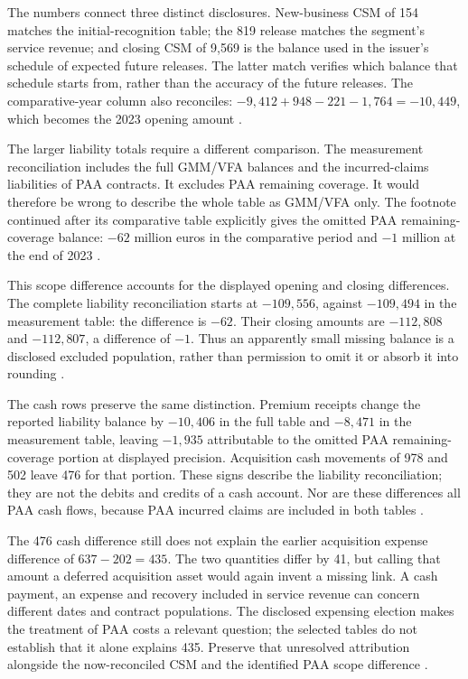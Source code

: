The numbers connect three distinct disclosures. New-business CSM of 154
matches the initial-recognition table; the 819 release matches the segment's
service revenue; and closing CSM of 9,569 is the balance used in the
issuer's schedule of expected future releases. The latter match verifies
which balance that schedule starts from, rather than the accuracy of the
future releases. The comparative-year column also reconciles:
$-9{,}412+948-221-1{,}764=-10{,}449$, which becomes the 2023 opening
amount \citep[printed pp. 247, 253--254 and 264]{munichre2023annual}.

The larger liability totals require a different comparison. The measurement
reconciliation includes the full GMM/VFA balances and the incurred-claims
liabilities of PAA contracts. It excludes PAA remaining coverage. It would
therefore be wrong to describe the whole table as GMM/VFA only. The footnote
continued after its comparative table explicitly gives the omitted PAA
remaining-coverage balance: $-62$ million euros in the comparative period
and $-1$ million at the end of 2023 \citep[printed pp. 241 and 247]{munichre2023annual}.

This scope difference accounts for the displayed opening and closing
differences. The complete liability reconciliation starts at $-109{,}556$,
against $-109{,}494$ in the measurement table: the difference is $-62$.
Their closing amounts are $-112{,}808$ and $-112{,}807$, a difference of
$-1$. Thus an apparently small missing balance is a disclosed excluded
population, rather than permission to omit it or absorb it into rounding
\citep[printed pp. 230--231 and 246--247]{munichre2023annual}.

\clearpage
The cash rows preserve the same distinction. Premium receipts change the
reported liability balance by $-10{,}406$ in the full table and $-8{,}471$
in the measurement table, leaving $-1{,}935$ attributable to the omitted
PAA remaining-coverage portion at displayed precision. Acquisition cash
movements of 978 and 502 leave 476 for that portion. These signs describe
the liability reconciliation; they are not the debits and credits of a
cash account. Nor are these differences all PAA cash flows, because PAA
incurred claims are included in both tables
\citep[printed pp. 231, 241 and 246]{munichre2023annual}.

The 476 cash difference still does not explain the earlier acquisition
expense difference of $637-202=435$. The two quantities differ by 41, but
calling that amount a deferred acquisition asset would again invent a
missing link. A cash payment, an expense and recovery included in service
revenue can concern different dates and contract populations. The disclosed
expensing election makes the treatment of PAA costs a relevant question;
the selected tables do not establish that it alone explains 435. Preserve
that unresolved attribution alongside the now-reconciled CSM and the
identified PAA scope difference
\citep[printed pp. 166, 230--231, 246 and 264]{munichre2023annual}.

